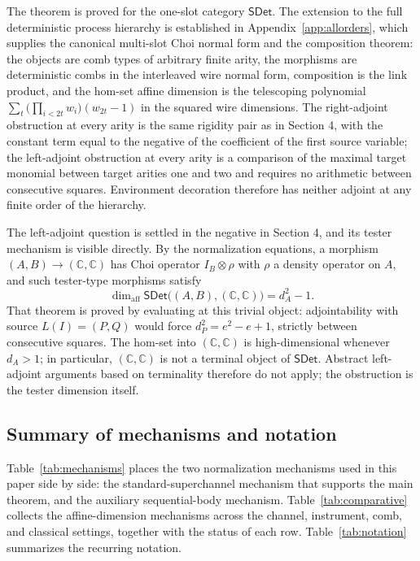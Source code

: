 \documentclass[11pt,a4paper]{article}
\theoremstyle{definition}
\theoremstyle{plain}
\theoremstyle{remark}
\newcommand{\affdim}{\dim_{\mathrm{aff}}}
\newcommand{\SDet}{\mathsf{SDet}}
\begin{document}
The theorem is proved for the one-slot category $\SDet$. The extension to the full deterministic process hierarchy is established in Appendix~\ref{app:allorders}, which supplies the canonical multi-slot Choi normal form and the composition theorem: the objects are comb types of arbitrary finite arity, the morphisms are deterministic combs in the interleaved wire normal form, composition is the link product, and the hom-set affine dimension is the telescoping polynomial $\sum_t\bigl(\prod_{i<2t}w_i\bigr)(w_{2t}-1)$ in the squared wire dimensions. The right-adjoint obstruction at every arity is the same rigidity pair as in Section 4, with the constant term equal to the negative of the coefficient of the first source variable; the left-adjoint obstruction at every arity is a comparison of the maximal target monomial between target arities one and two and requires no arithmetic between consecutive squares. Environment decoration therefore has neither adjoint at any finite order of the hierarchy.

The left-adjoint question is settled in the negative in Section 4, and its tester mechanism is visible directly. By the normalization equations, a morphism $(A,B)\to(\mathbb C,\mathbb C)$ has Choi operator $I_B\otimes\rho$ with $\rho$ a density operator on $A$, and such tester-type morphisms satisfy
\[
\affdim\SDet\bigl((A,B),(\mathbb C,\mathbb C)\bigr)=d_A^2-1.
\]
That theorem is proved by evaluating at this trivial object: adjointability with source $L(I)=(P,Q)$ would force $d_P^2=e^2-e+1$, strictly between consecutive squares. The hom-set into $(\mathbb C,\mathbb C)$ is high-dimensional whenever $d_A>1$; in particular, $(\mathbb C,\mathbb C)$ is not a terminal object of $\SDet$. Abstract left-adjoint arguments based on terminality therefore do not apply; the obstruction is the tester dimension itself.

\subsection{Summary of mechanisms and notation}

Table~\ref{tab:mechanisms} places the two normalization mechanisms used
in this paper side by side: the standard-superchannel mechanism that
supports the main theorem, and the auxiliary sequential-body mechanism.
Table~\ref{tab:comparative} collects the affine-dimension mechanisms
across the channel, instrument, comb, and classical settings, together
with the status of each row. Table~\ref{tab:notation} summarizes the
recurring notation.
\end{document}
